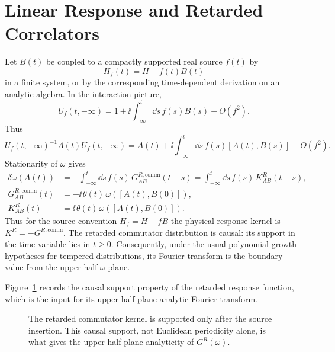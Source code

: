 \section{Linear Response and Retarded Correlators}

Let \(B(t)\) be coupled to a compactly supported real source \(f(t)\) by
\begin{equation}
  H_f(t)=H-f(t)B(t)
  \label{eq:thermal-source-coupling}
\end{equation}
in a finite system, or by the corresponding time-dependent derivation on an
analytic algebra.  In the interaction picture,
\begin{equation}
  U_f(t,-\infty)
  =
  1+\ii\int_{-\infty}^{t}\dd s\,f(s)B(s)+O(f^2).
  \label{eq:linear-response-interaction-evolution}
\end{equation}
Thus
\[
  U_f(t,-\infty)^{-1}A(t)U_f(t,-\infty)
  =
  A(t)
  +\ii\int_{-\infty}^{t}\dd s\,f(s)[A(t),B(s)]
  +O(f^2).
\]
Stationarity of \(\omega\) gives
\begin{equation}
\begin{aligned}
  \delta\omega(A(t))
  &=
  -\int_{-\infty}^{t}\dd s\,f(s)\,
  G^{R,\mathrm{comm}}_{AB}(t-s)
  =
  \int_{-\infty}^{t}\dd s\,f(s)\,
  K^R_{AB}(t-s),\\
  G^{R,\mathrm{comm}}_{AB}(t)
  &=
  -\ii\,\theta(t)\,\omega([A(t),B(0)]),
  \\
  K^R_{AB}(t)
  &=
  \ii\,\theta(t)\,\omega([A(t),B(0)]) .
\end{aligned}
  \label{eq:thermal-linear-response-retarded}
\end{equation}
Thus for the source convention \(H_f=H-fB\) the physical response kernel is
\(K^R=-G^{R,\mathrm{comm}}\).  The retarded commutator distribution is causal:
its support in the time variable lies in \(t\geq0\).  Consequently, under the
usual polynomial-growth hypotheses for tempered distributions, its Fourier
transform is the boundary value from the upper half \(\omega\)-plane.

Figure~\ref{fig:retarded-support} records the causal support property of the
retarded response function, which is the input for its upper-half-plane
analytic Fourier transform.

\begin{figure}[H]
\centering
{}
\caption{The retarded commutator kernel is supported only after the source insertion.
This causal support, not Euclidean periodicity alone, is what gives the
upper-half-plane analyticity of \(G^R(\omega)\).}
\label{fig:retarded-support}
\end{figure}


